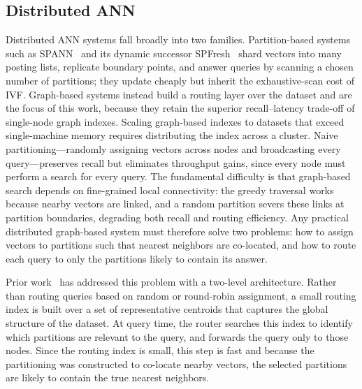 \documentclass[sigconf,review,anonymous]{acmart}
\begin{document}
\subsection{Distributed ANN}
    Distributed ANN systems fall broadly into two families. Partition-based systems such as SPANN~\cite{chen2021spann} and its dynamic successor SPFresh~\cite{xu2023spfresh} shard vectors into many posting lists, replicate boundary points, and answer queries by scanning a chosen number of partitions; they update cheaply but inherit the exhaustive-scan cost of IVF. Graph-based systems instead build a routing layer over the dataset and are the focus of this work, because they retain the superior recall--latency trade-off of single-node graph indexes. Scaling graph-based indexes to datasets that exceed single-machine memory requires distributing the index across a cluster. Naive partitioning---randomly assigning vectors across nodes and broadcasting every query---preserves recall but eliminates throughput gains, since every node must perform a search for every query. The fundamental difficulty is that graph-based search depends on fine-grained local connectivity: the greedy traversal works because nearby vectors are linked, and a random partition severs these links at partition boundaries, degrading both recall and routing efficiency. Any practical distributed graph-based system must therefore solve two problems: how to assign vectors to partitions such that nearest neighbors are co-located, and how to route each query to only the partitions likely to contain its answer.
    

    Prior work~\cite{deng2019pyramid, gottensuren2025unleashing} has addressed this problem with a two-level architecture.
    Rather than routing queries based on random or round-robin assignment, a small routing index is built over a set of representative centroids that captures the global structure of the dataset. At query time, the router searches this index to identify which partitions are relevant to the query, and forwards the query only to those nodes. Since the routing index is small, this step is fast and because the partitioning was constructed to co-locate nearby vectors, the selected partitions are likely to contain the true nearest neighbors.
\end{document}
